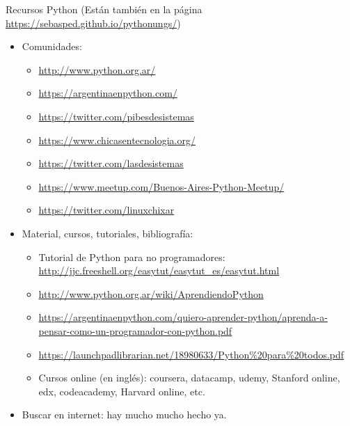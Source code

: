 \documentclass{beamer}
\begin{document}
\begin{frame}{Recursos Python}
(\footnotesize Están también en la página \url{https://sebasped.github.io/pythonungs/})
\begin{itemize}
	\item Comunidades:
	\begin{itemize}
		\item \footnotesize\url{http://www.python.org.ar/}
		\item \footnotesize\url{https://argentinaenpython.com/}
		\item \footnotesize\url{https://twitter.com/pibesdesistemas}
		\item \footnotesize\url{https://www.chicasentecnologia.org/}
		\item \footnotesize\url{https://twitter.com/lasdesistemas}
		\item \footnotesize\url{https://www.meetup.com/Buenos-Aires-Python-Meetup/}
		\item \footnotesize\url{https://twitter.com/linuxchixar}
	\end{itemize}\pause
	\item Material, cursos, tutoriales, bibliografía:
	\begin{itemize}
		\item Tutorial de Python para no programadores: \footnotesize\url{http://jjc.freeshell.org/easytut/easytut_es/easytut.html}
		\item \footnotesize\url{http://www.python.org.ar/wiki/AprendiendoPython}
		\item \footnotesize\url{https://argentinaenpython.com/quiero-aprender-python/aprenda-a-pensar-como-un-programador-con-python.pdf}
		\item \footnotesize\url{https://launchpadlibrarian.net/18980633/Python\%20para\%20todos.pdf}
		\item Cursos online (en inglés): coursera, datacamp, udemy, Stanford online, edx, codeacademy, Harvard online, etc.
	\end{itemize}\pause
	\item Buscar en internet: hay mucho mucho hecho ya.
\end{itemize}

\end{frame}
\end{document}
